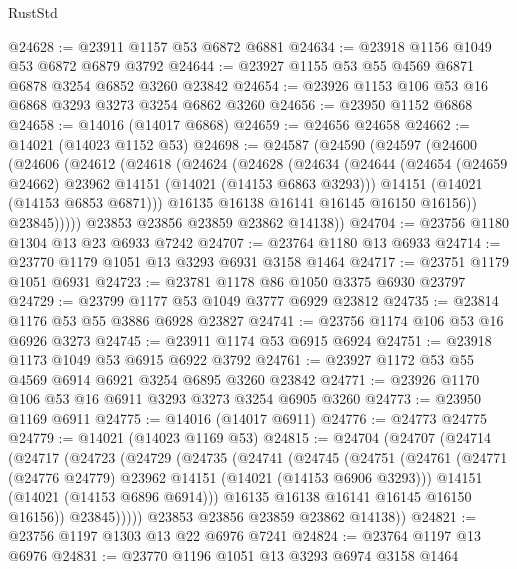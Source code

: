 \begin{lexlean}{RustStd}
\begin{coremodule}
@24628 := @23911 @1157 @53 @6872 @6881
@24634 := @23918 @1156 @1049 @53 @6872 @6879 @3792
@24644 := @23927 @1155 @53 @55 @4569 @6871 @6878 @3254 @6852 @3260 @23842
@24654 := @23926 @1153 @106 @53 @16 @6868 @3293 @3273 @3254 @6862 @3260
@24656 := @23950 @1152 @6868
@24658 := @14016 (@14017 @6868)
@24659 := @24656 @24658
@24662 := @14021 (@14023 @1152 @53)
@24698 := @24587
    (@24590
      (@24597
        (@24600
          (@24606
            (@24612
              (@24618
                (@24624
                  (@24628
                    (@24634
                      (@24644
                        (@24654 (@24659 @24662) @23962 @14151 (@14021 (@14153 @6863 @3293)))
                        @14151
                        (@14021 (@14153 @6853 @6871)))
                      @16135
                      @16138
                      @16141
                      @16145
                      @16150
                      @16156))
                  @23845)))))
        @23853
        @23856
        @23859
        @23862
        @14138))
@24704 := @23756 @1180 @1304 @13 @23 @6933 @7242
@24707 := @23764 @1180 @13 @6933
@24714 := @23770 @1179 @1051 @13 @3293 @6931 @3158 @1464
@24717 := @23751 @1179 @1051 @6931
@24723 := @23781 @1178 @86 @1050 @3375 @6930 @23797
@24729 := @23799 @1177 @53 @1049 @3777 @6929 @23812
@24735 := @23814 @1176 @53 @55 @3886 @6928 @23827
@24741 := @23756 @1174 @106 @53 @16 @6926 @3273
@24745 := @23911 @1174 @53 @6915 @6924
@24751 := @23918 @1173 @1049 @53 @6915 @6922 @3792
@24761 := @23927 @1172 @53 @55 @4569 @6914 @6921 @3254 @6895 @3260 @23842
@24771 := @23926 @1170 @106 @53 @16 @6911 @3293 @3273 @3254 @6905 @3260
@24773 := @23950 @1169 @6911
@24775 := @14016 (@14017 @6911)
@24776 := @24773 @24775
@24779 := @14021 (@14023 @1169 @53)
@24815 := @24704
    (@24707
      (@24714
        (@24717
          (@24723
            (@24729
              (@24735
                (@24741
                  (@24745
                    (@24751
                      (@24761
                        (@24771 (@24776 @24779) @23962 @14151 (@14021 (@14153 @6906 @3293)))
                        @14151
                        (@14021 (@14153 @6896 @6914)))
                      @16135
                      @16138
                      @16141
                      @16145
                      @16150
                      @16156))
                  @23845)))))
        @23853
        @23856
        @23859
        @23862
        @14138))
@24821 := @23756 @1197 @1303 @13 @22 @6976 @7241
@24824 := @23764 @1197 @13 @6976
@24831 := @23770 @1196 @1051 @13 @3293 @6974 @3158 @1464

\end{coremodule}
\end{lexlean}
